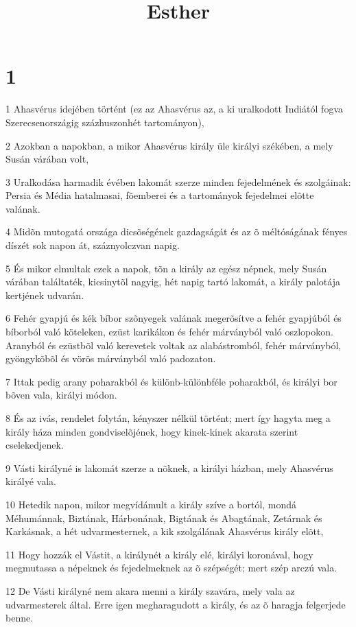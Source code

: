 

\title{Esther}


\chapter{1}

\par 1 Ahasvérus idejében történt (ez az Ahasvérus az, a ki uralkodott Indiától fogva Szerecsenországig százhuszonhét tartományon),
\par 2 Azokban a napokban, a mikor Ahasvérus király üle királyi székében, a mely Susán várában volt,
\par 3 Uralkodása harmadik évében lakomát szerze minden fejedelmének és szolgáinak: Persia és Média hatalmasai, fõemberei és a tartományok fejedelmei elõtte valának.
\par 4 Midõn mutogatá országa dicsõségének gazdagságát és az õ méltóságának fényes díszét sok napon át, száznyolczvan napig.
\par 5 És mikor elmultak ezek a napok, tõn a király az egész népnek, mely Susán várában találtaték, kicsinytõl nagyig, hét napig tartó lakomát, a király palotája kertjének udvarán.
\par 6 Fehér gyapjú és kék bíbor szõnyegek valának megerõsítve a fehér gyapjúból és bíborból való köteleken, ezüst karikákon és fehér márványból való oszlopokon. Aranyból és ezüstbõl való kerevetek voltak az alabástromból, fehér márványból, gyöngykõbõl és vörös márványból való padozaton.
\par 7 Ittak pedig arany poharakból és különb-különbféle poharakból, és királyi bor bõven vala, királyi módon.
\par 8 És az ivás, rendelet folytán, kényszer nélkül történt; mert így hagyta meg a király háza minden gondviselõjének, hogy kinek-kinek akarata szerint cselekedjenek.
\par 9 Vásti királyné is lakomát szerze a nõknek, a királyi házban, mely Ahasvérus királyé vala.
\par 10 Hetedik napon, mikor megvídámult a király szíve a bortól, mondá Méhumánnak, Biztának, Hárbonának, Bigtának és Abagtának, Zetárnak és Karkásnak, a hét udvarmesternek, a kik szolgálának Ahasvérus király elõtt,
\par 11 Hogy hozzák el Vástit, a királynét a király elé, királyi koronával, hogy megmutassa a népeknek és fejedelmeknek az õ szépségét; mert szép arczú vala.
\par 12 De Vásti királyné nem akara menni a király szavára, mely vala az udvarmesterek által. Erre igen megharagudott a király, és az õ haragja felgerjede benne.

